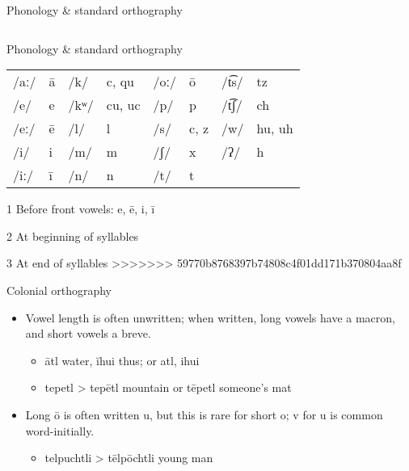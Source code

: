 \documentclass[12pt]{beamer}
\newcommand{\nah}[1]{\textcolor{nahgrn}{#1}}
\newcommand{\trs}[1]{\textcolor{nahblu}{#1}}
\begin{document}
\begin{frame}
\begin{columns}[t]
\begin{column}{.22\linewidth}
\begin{block}{Phonology \& standard orthography}
\begin{threeparttable}
\begin{tablenotes}
\begin{frame}
\begin{columns}[t]
\begin{column}{.23\linewidth}
\begin{block}{Phonology \& standard orthography}
\begin{threeparttable}
\begin{tabular}{l@{\,}l@{\qquad}l@{\,}l@{\qquad}l@{\,}l@{\qquad}l@{\,}l}
            /aː/ & \nah{ā} & /k/  & \nah{c}, \nah{qu}\tnote{1}           & /oː/ & \nah{ō}                   & /t͡s/ & \nah{tz}                             \\
            /e/  & \nah{e} & /kʷ/ & \nah{cu}\tnote{2}, \nah{uc}\tnote{3} & /p/  & \nah{p}                   & /t͡ʃ/ & \nah{ch}                             \\
            /eː/ & \nah{ē} & /l/  & \nah{l}                              & /s/  & \nah{c}\tnote{1}, \nah{z} & /w/  & \nah{hu}\tnote{2}, \nah{uh}\tnote{3} \\
            /i/  & \nah{i} & /m/  & \nah{m}                              & /ʃ/  & \nah{x}                   & /ʔ/  & \nah{h}                              \\
            /iː/ & \nah{ī} & /n/  & \nah{n}                              & /t/  & \nah{t}                   &      &
          \end{tabular}
          \begin{tablenotes}
            \item[1] Before front vowels: \nah{e, ē, i, ī}
            \item[2] At beginning of syllables
            \item[3] At end of syllables
>>>>>>> 59770b8768397b74808c4f01dd171b370804aa8f
          \end{tablenotes}
        \end{threeparttable}
      \end{block}
      \begin{block}{Colonial orthography}
        \begin{itemize}
<<<<<<< HEAD
        \item Vowel length is often unwritten; when written, long vowels have a macron, and short vowels a breve.
          \begin{itemize}
          \item  \nah{ātl} \trs{water}, \nah{ĭhui} \trs{thus}; or \nah{atl}, \nah{ihui}
          \item  \nah{tepetl} > \nah{tepētl} \trs{mountain} or \nah{tēpetl} \trs{someone's mat}
          \end{itemize}
        \item  Long \nah{ō} is often written \nah{u}, but this is rare for short \nah{o}; \nah{v} for \nah{u} is common word-initially.
          \begin{itemize}
          \item \nah{telpuchtli} > \nah{tēlpōchtli} \trs{young man}

\end{itemize}
\end{itemize}
\end{block}
\end{column}
\end{columns}
\end{frame}
\end{tablenotes}
\end{threeparttable}
\end{block}
\end{column}
\end{columns}
\end{frame}
\end{document}
